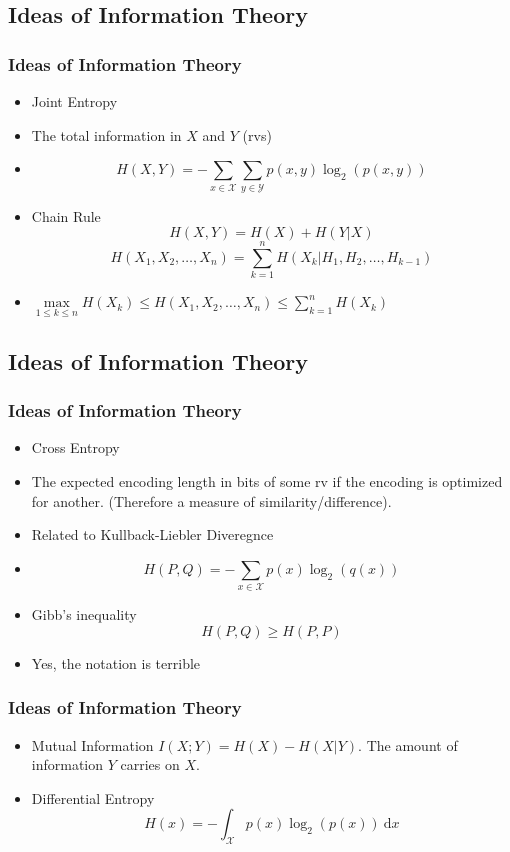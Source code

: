 \documentclass[xcolor=dvipsnames]{beamer}
\begin{document}
	\subsection{Ideas of Information Theory}
	\begin{frame}
	\frametitle{Ideas of Information Theory}
	\begin{itemize}
	    \item Joint Entropy
	    \pause
	    \item The total information in $X$ and $Y$ (rvs)
	    \pause
	    \item $$H(X, Y) = -\sum_{x \in \mathcal{X}}\sum_{y \in \mathcal{Y}}p(x, y) \log_2 \left(p(x, y)\right)$$
	    \pause
	    \item Chain Rule $$ H(X, Y) = H(X) + H(Y|X) $$
	    \pause $$ H(X_1, X_2, \dots, X_n) = \sum_{k=1}^n H(X_k|H_1, H_2, \dots, H_{k-1}) $$
	    \pause
	    \item $ \displaystyle \max \limits_{1 \leq k \leq n} H(X_k)  \leq H(X_1, X_2, \dots, X_n) \leq \sum_{k=1}^n H(X_k)$
	\end{itemize}
	\end{frame}
	
		\subsection{Ideas of Information Theory}
	\begin{frame}
	\frametitle{Ideas of Information Theory}
	\begin{itemize}
	    \item Cross Entropy
	    \pause
	    \item The expected encoding length in bits of some rv if the encoding is optimized for another. (Therefore a measure of similarity/difference). 
	    \pause
	    \item Related to Kullback-Liebler Diveregnce
	    \pause
	    \item $$H(P, Q) = -\sum_{x \in \mathcal{X}} p(x) \log_2(q(x))$$
	    \pause
	    \item Gibb's inequality $$  H(P, Q) \geq H(P, P)$$
	    \item Yes, the notation is terrible
	\end{itemize}
	\end{frame}
	
	\begin{frame}
	\frametitle{Ideas of Information Theory}
	    \begin{itemize}
	        \item Mutual Information $I(X; Y) = H(X) - H(X|Y)$. The amount of information $Y$ carries on $X$. 
	        \pause
	        \item Differential Entropy $$ H(x) =  -\int_{\mathcal{X}} p(x) \log_2(p(x)) \ \text{d}x$$
	    \end{itemize}
	\end{frame}
	
\end{document}
